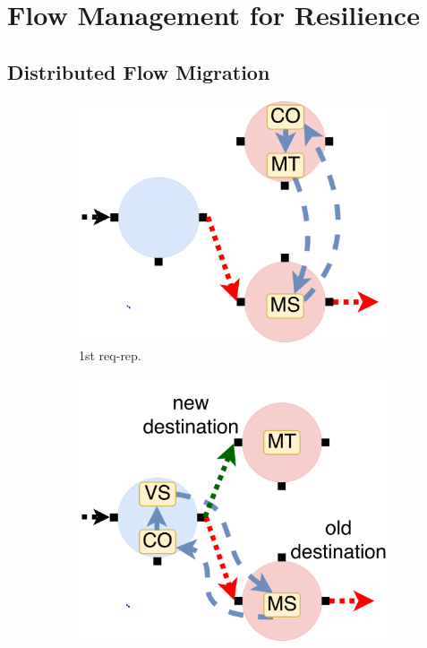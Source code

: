 \section{Flow Management for Resilience}
\label{sec:resilience}

\subsection{Distributed Flow Migration}

\begin{figure}[!h]
\begin{subfigure}[t]{0.33\linewidth}
   \centering
   \includegraphics[width=\columnwidth]{figure/nfactor-mig1.pdf}
   \caption{1st req-rep.}\label{fig:mig1}
  \end{subfigure}\hfill
  \begin{subfigure}[t]{0.33\linewidth}
     \centering
     \includegraphics[width=\columnwidth]{figure/nfactor-mig2.pdf}

\end{subfigure}
\end{figure}
